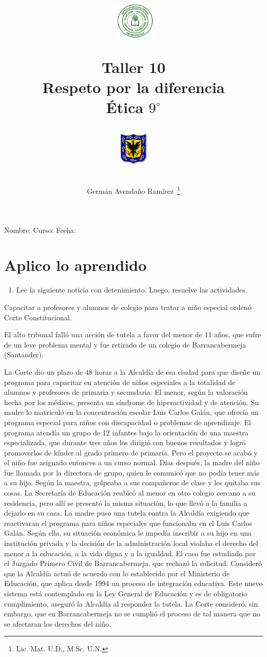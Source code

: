 \documentclass[10pt,twoside]{article}
\author{Germ\'an Avenda\~no Ram\'irez~\thanks{Lic. Mat. U.D., M.Sc. U.N.}}
\title{\begin{minipage}{.2\textwidth}
\includegraphics[height=1.75cm]{Images/logo-colegio.png}\end{minipage}
\begin{minipage}{.55\textwidth}
\begin{center}
Taller 10\\
Respeto por la diferencia\\
Ética $9^{\circ}$
\end{center}
\end{minipage}\hfill
\begin{minipage}{.2\textwidth}
\includegraphics[height=1.75cm]{Images/logo-sed.png} 
\end{minipage}}
\date{}
\begin{document}
\maketitle
Nombre: \hrulefill Curso: \underline{\hspace*{44pt}} Fecha: \underline{\hspace*{2.5cm}}
\section*{Aplico lo aprendido}
\begin{enumerate}
\item Lee la siguiente noticia con detenimiento. Luego, resuelve las
actividades.
\end{enumerate}
Capacitar a profesores y alumnos de colegio para tratar a niño especial ordenó Corte Constitucional.

El alto tribunal falló una acción de tutela a favor del menor de 11 años, que sufre de un leve problema mental y fue retirado de un colegio de Barrancabermeja (Santander).

La Corte dio un plazo de 48 horas a la Alcaldía de esa ciudad
para que diseñe un programa para capacitar en atención de niños especiales a la totalidad de alumnos y profesores de primaria y secundaria. El menor, según la valoración hecha por los médicos, presenta un síndrome de hiperactividad y de atención. Su madre lo matriculó en la concentración escolar Luis Carlos Galán, que ofrecía un programa especial para niños con discapacidad o problemas de aprendizaje. El programa atendía un grupo de 12 infantes bajo la
orientación de una maestra especializada, que durante tres años los dirigió con buenos resultados y logró promoverlos de kínder al grado primero de primaria. Pero el proyecto se acabó y el niño fue asignado entonces a un curso normal. Días después, la madre del niño fue llamada por la directora de grupo, quien le comunicó que no podía tener más a su hijo. Según la maestra, golpeaba a sus compañeros de clase y les quitaba sus cosas. La Secretaría de Educación reubicó al menor en otro colegio cercano a su residencia, pero allí se presentó la misma situación, lo que llevó a la familia
a dejarlo en su casa. La madre puso una tutela contra la Alcaldía exigiendo que reactivaran el programa para niños especiales que funcionaba en el Luis Carlos Galán. Según ella, su situación económica le impedía inscribir a su hijo en una institución privada y la decisión de la administración local violaba el derecho del menor a la educación, a la vida digna y a la igualdad. El caso fue estudiado por el Juzgado Primero Civil de Barrancabermeja, que rechazó la solicitud. Consideró que la Alcaldía actuó de acuerdo con lo establecido por el Ministerio de Educación, que aplica desde 1994 un proceso de integración educativa. Este nuevo sistema está
contemplado en la Ley General de Educación y es de obligatorio cumplimiento, aseguró la Alcaldía al responder la tutela. La Corte consideró, sin embargo, que en Barrancabermeja no se cumplió el proceso de tal manera que no se afectaran los derechos del niño.
\end{document}
